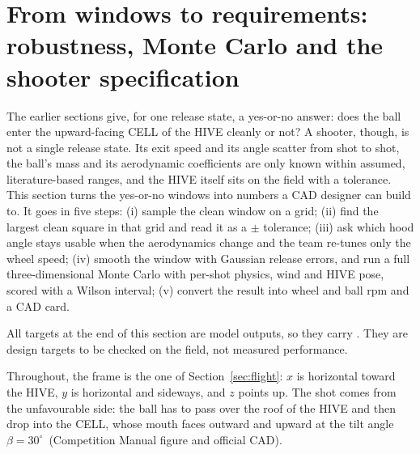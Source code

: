 \section{From windows to requirements: robustness, Monte Carlo and the shooter specification}
\label{sec:robust_spec}


The earlier sections give, for one release state, a yes-or-no answer: does the ball enter the
upward-facing CELL of the HIVE cleanly or not?
A shooter, though, is not a single release state.
Its exit speed and its angle scatter from shot to shot, the ball's mass and its aerodynamic
coefficients are only known within assumed, literature-based ranges, and the HIVE itself sits on the field
with a tolerance.
This section turns the yes-or-no windows into numbers a CAD designer can build to.
It goes in five steps:
(i) sample the clean window on a grid;
(ii) find the largest clean square in that grid and read it as a $\pm$ tolerance;
(iii) ask which hood angle stays usable when the aerodynamics change and the team re-tunes only
the wheel speed;
(iv) smooth the window with Gaussian release errors, and run a full three-dimensional Monte Carlo
with per-shot physics, wind and HIVE pose, scored with a Wilson interval;
(v) convert the result into wheel and ball rpm and a CAD card.

All targets at the end of this section are model outputs, so they carry \predicted.
They are design targets to be checked on the field, not measured performance.

Throughout, the frame is the one of Section~\ref{sec:flight}: $x$ is horizontal toward the HIVE,
$y$ is horizontal and sideways, and $z$ points up.
The shot comes from the unfavourable side: the ball has to pass over the roof of the HIVE and then
drop into the CELL, whose mouth faces outward and upward at the tilt angle
$\beta = 30^\circ$\confirmed\ (Competition Manual figure and official CAD).

